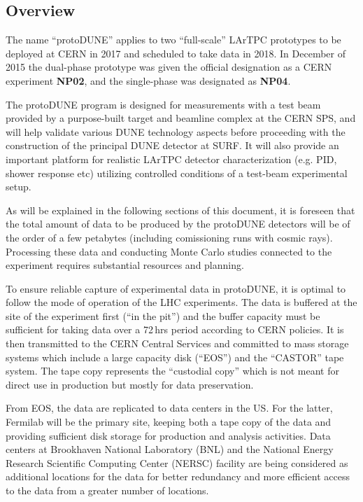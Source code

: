 \label{sec:protodune}
\subsection{Overview}

The name ``protoDUNE'' applies to two ``full-scale'' LArTPC prototypes to be deployed at CERN in 2017 and scheduled
to take data in 2018. In December of 2015 the dual-phase prototype was given the official designation as a CERN experiment
\textbf{NP02}, and the single-phase was designated as \textbf{NP04}.

The protoDUNE program is designed for measurements with a test beam provided by a purpose-built target and beamline complex at the
CERN SPS, and will help validate various DUNE technology aspects before proceeding with the construction of the principal DUNE detector
at SURF. It will also provide an important platform for realistic LArTPC detector characterization (e.g. PID, shower response etc) utilizing
controlled conditions of a test-beam experimental setup.

As will be explained in the following sections of this document, it is foreseen that the total amount of data to be produced
by the protoDUNE detectors will be of the order of a few petabytes (including comissioning runs with cosmic rays). Processing
these data and conducting Monte Carlo studies connected to the experiment requires substantial resources and planning.

To ensure reliable capture of experimental data in protoDUNE, it is optimal to follow the mode of operation of the LHC experiments.
The data is buffered at the site of the experiment first (``in the pit'') and the buffer capacity must be sufficient for taking
data over a 72\,hrs period according to CERN policies. It is then transmitted to the CERN Central Services and committed to
mass storage systems which include a large capacity disk (``EOS'') and the ``CASTOR'' tape system. The tape copy
represents the ``custodial copy'' which is not meant for direct use in production but mostly for data preservation.

From EOS, the data are replicated to data centers in the US. For the latter, Fermilab will be the primary site, keeping both a tape copy of the data and providing
sufficient disk storage for production and analysis activities. Data centers at Brookhaven National Laboratory (BNL) and the
National Energy Research Scientific Computing Center (NERSC) facility are being considered as additional locations for the data
for better redundancy and more efficient access to the data from a greater number of locations.


